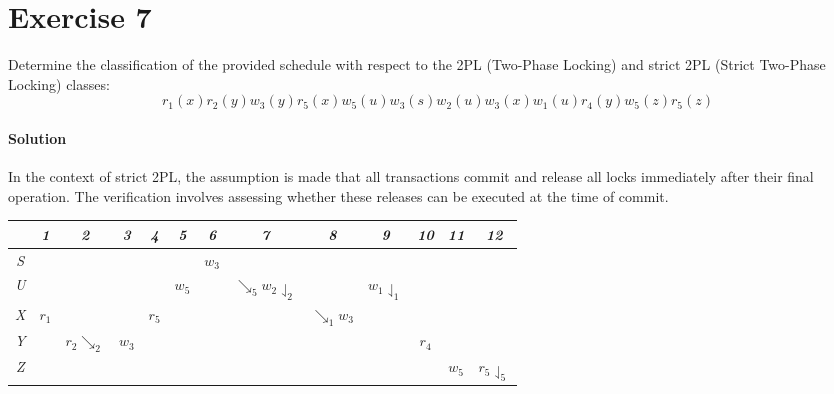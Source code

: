 \section{Exercise 7}
Determine the classification of the provided schedule with respect to the 2PL (Two-Phase Locking) and strict 2PL (Strict Two-Phase Locking) classes:
\[r_1(x) r_2(y) w_3(y) r_5(x) w_5(u) w_3(s) w_2(u) w_3(x) w_1(u) r_4(y) w_5(z) r_5(z)\]

\paragraph*{Solution}
In the context of strict 2PL, the assumption is made that all transactions commit and release all locks immediately after their final operation. 
The verification involves assessing whether these releases can be executed at the time of commit.
\begin{table}[H]
    \centering
    \begin{tabular}{c|cccccccccccc}
            & \textit{1} & \textit{2}      & \textit{3} & \textit{4} & \textit{5} & \textit{6} & \textit{7}                        & \textit{8}      & \textit{9}              & \textit{10} & \textit{11} & \textit{12}             \\ \hline
    \textit{S} &            &                 &            &            &            & $w_3$      &                                   &                 &                         &             &             &                         \\
    \textit{U} &            &                 &            &            & $w_5$      &            & $\searrow_5w_2\downharpoonleft_2$ &                 & $w_1\downharpoonleft_1$ &             &             &                         \\
    \textit{X} & $r_1$      &                 &            & $r_5$      &            &            &                                   & $\searrow_1w_3$ &                         &             &             &                         \\
    \textit{Y} &            & $r_2\searrow_2$ & $w_3$      &            &            &            &                                   &                 &                         & $r_4$       &             &                         \\
    \textit{Z} &            &                 &            &            &            &            &                                   &                 &                         &             & $w_5$       & $r_5\downharpoonleft_5$
    \end{tabular}
\end{table}
